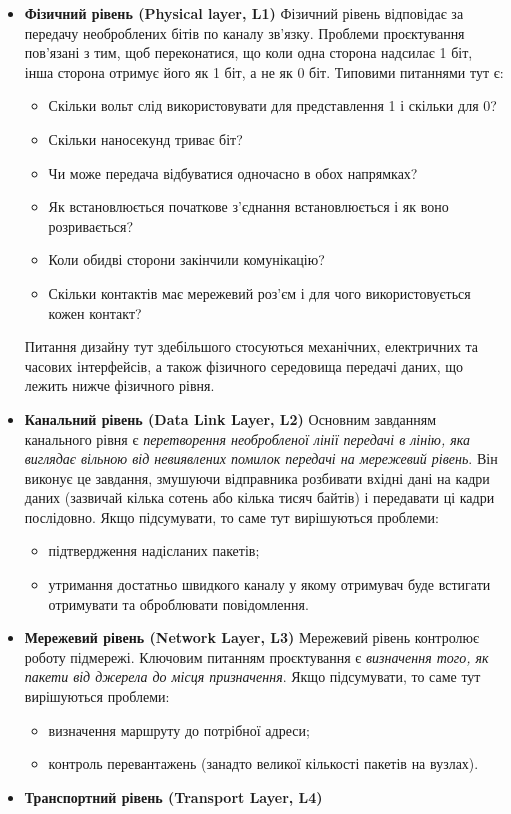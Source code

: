 \begin{itemize}
    \item \textbf{Фізичний рівень (Physical layer, L1)}
    Фізичний рівень відповідає за передачу необроблених бітів по каналу зв'язку. Проблеми проєктування пов'язані з тим, щоб переконатися, що коли одна сторона надсилає 1 біт, інша сторона отримує його як 1 біт, а не як 0 біт. Типовими питаннями тут є:
    \begin{itemize}
        \item Скільки вольт слід використовувати для представлення 1 і скільки для 0?
        \item Скільки наносекунд триває біт?
        \item Чи може передача відбуватися одночасно в обох напрямках?
        \item Як встановлюється початкове з'єднання встановлюється і як воно розривається?
        \item Коли обидві сторони закінчили комунікацію?
        \item Скільки контактів має мережевий роз'єм і для чого використовується кожен контакт?
    \end{itemize}
    Питання дизайну тут здебільшого стосуються механічних, електричних та часових інтерфейсів, а також фізичного середовища передачі даних, що лежить нижче фізичного рівня.
    \item \textbf{Канальний рівень (Data Link Layer, L2)}
    Основним завданням канального рівня є \textit{перетворення необробленої лінії передачі в лінію, яка виглядає вільною від невиявлених помилок передачі на мережевий рівень}. Він виконує це завдання, змушуючи відправника розбивати вхідні дані на кадри даних (зазвичай кілька сотень або кілька тисяч байтів) і передавати ці кадри послідовно.
    Якщо підсумувати, то саме тут вирішуються проблеми:
    \begin{itemize}
        \item підтвердження надісланих пакетів;
        \item утримання достатньо швидкого каналу у якому отримувач буде встигати отримувати та оброблювати повідомлення.
    \end{itemize}
    \item \textbf{Мережевий рівень (Network Layer, L3)}
    Мережевий рівень контролює роботу підмережі. Ключовим питанням проєктування є \textit{визначення того, як пакети від джерела до місця призначення}.
    Якщо підсумувати, то саме тут вирішуються проблеми:
    \begin{itemize}
        \item визначення маршруту до потрібної адреси;
        \item контроль перевантажень (занадто великої кількості пакетів на вузлах).
    \end{itemize}
    \item \textbf{Транспортний рівень (Transport Layer, L4)}
    

\end{itemize}

